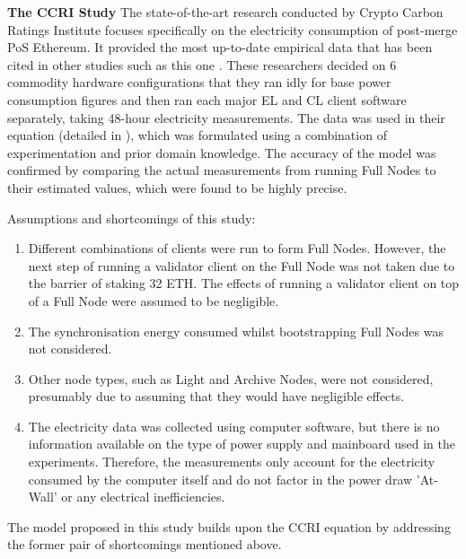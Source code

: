 \textbf{The CCRI Study } 
\label{CCRIModelLitRev}
The state-of-the-art research conducted by Crypto Carbon Ratings Institute focuses specifically on the electricity consumption of post-merge PoS Ethereum. It provided the most up-to-date empirical data that has been cited in other studies such as this one \cite{CryptoCarbonRatingsInstitute2022TheNetwork}. These researchers decided on 6 commodity hardware configurations that they ran idly for base power consumption figures and then ran each major EL and CL client software separately, taking 48-hour electricity measurements. The data was used in their equation (detailed in ), which was formulated using a combination of experimentation and prior domain knowledge. The accuracy of the model was confirmed by comparing the actual measurements from running Full Nodes to their estimated values, which were found to be highly precise.

Assumptions and shortcomings of this study:
\begin{enumerate}
    \item Different combinations of clients were run to form Full Nodes. However, the next step of running a validator client on the Full Node was not taken due to the barrier of staking 32 ETH. The effects of running a validator client on top of a Full Node were assumed to be negligible.
    
    \item The synchronisation energy consumed whilst bootstrapping Full Nodes was not considered.
    
    \item Other node types, such as Light and Archive Nodes, were not considered, presumably due to assuming that they would have negligible effects.

    \item The electricity data was collected using computer software, but there is no information available on the type of power supply and mainboard used in the experiments. Therefore, the measurements only account for the electricity consumed by the computer itself and do not factor in the power draw 'At-Wall' or any electrical inefficiencies. \cite{Warkozek2012ACenters}
\end{enumerate}

The model proposed in this study builds upon the CCRI equation by addressing the former pair of shortcomings mentioned above. 





